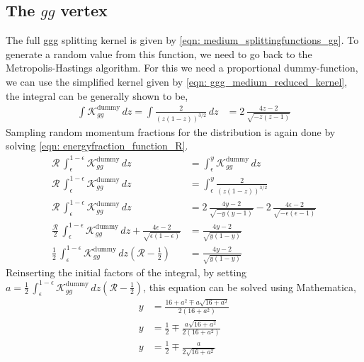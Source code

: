 \documentclass[main.tex]{subfiles}
\begin{document}
\subsection*{The \(gg\) vertex}
The full ggg splitting kernel is given by \autoref{eqn: medium_splittingfunctions_gg}.
To generate a random value from this function, we need to go back to the Metropolis-Hastings algorithm. 
For this we need a proportional dummy-function, we can use the simplified kernel given by \autoref{eqn: ggg_medium_reduced_kernel}, the integral can be generally shown to be, 
\begin{align}
    \int \mathcal{K}_{gg}^{\text{dummy}}\,dz = \int \frac{2}{(z(1-z))^{3/2}}\,dz &= 2\,\frac{4z-2}{\sqrt{-z(z-1)}}
\end{align}
Sampling random momentum fractions for the distribution is again done by solving \autoref{eqn: energyfraction_function_R}.
\begin{align}
    \mathcal{R}\, \int_{\epsilon}^{1-\epsilon} \mathcal{K}_{gg}^{\text{dummy}}\,dz &= \int_{\epsilon}^{y} \mathcal{K}_{gg}^{\text{dummy}}\,dz \\
    \mathcal{R}\, \int_{\epsilon}^{1-\epsilon} \mathcal{K}_{gg}^{\text{dummy}}\,dz &= \int_\epsilon^{y} \frac{2}{(z(1-z))^{3/2}} \nonumber \\
    \mathcal{R}\, \int_{\epsilon}^{1-\epsilon} \mathcal{K}_{gg}^{\text{dummy}}\,dz &= 2\,\frac{4y-2}{\sqrt{-y(y-1)}} - 2\,\frac{4\epsilon-2}{\sqrt{-\epsilon(\epsilon-1)}} \nonumber\\
    \frac{\mathcal{R}}{2}\, \int_{\epsilon}^{1-\epsilon} \mathcal{K}_{gg}^{\text{dummy}}\,dz + \frac{4\epsilon-2}{\sqrt{\epsilon(1-\epsilon)}} &= \frac{4y-2}{\sqrt{y(1-y)}} \\
    \frac{1}{2}\, \int_{\epsilon}^{1-\epsilon} \mathcal{K}_{gg}^{\text{dummy}}\,dz \left(\mathcal{R}-\frac{1}{2} \right) &= \frac{4y-2}{\sqrt{y(1-y)}}
\end{align}
Reinserting the initial factors of the integral, by setting \( a= \frac{1}{2}\, \int_{\epsilon}^{1-\epsilon} \mathcal{K}_{gg}^{\text{dummy}}\,dz \left(\mathcal{R}-\frac{1}{2} \right)\), this equation can be solved using Mathematica,
\begin{align}\label{eqn: sampling_p_ggg_medium}
    y &= \frac{16 + a^2 \mp a \sqrt{16 + a^2}}{2 (16 + a^2)} \nonumber\\
    y &= \frac{1}{2} \mp \frac{a \sqrt{16 + a^2}}{2 (16 + a^2)} \nonumber\\
    y &= \frac{1}{2} \mp \frac{a }{2 \sqrt{16 + a^2}}
\end{align}
\end{document}
